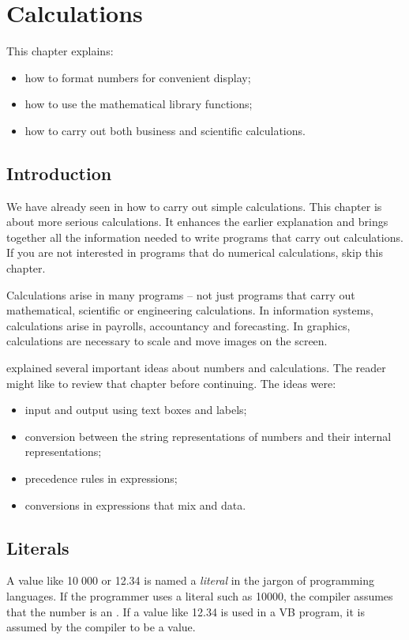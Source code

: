 \chapter{Calculations}
	\label{ch:calculations}

	This chapter explains:
	\begin{itemize}
    \item how to format numbers for convenient display;
    \item how to use the mathematical library functions;
    \item how to carry out both business and scientific calculations.
	\end{itemize}


  \section{Introduction}
	We have already seen in  how to carry out simple calculations. This chapter is about more serious calculations. It enhances the earlier explanation and brings together all the information needed to write programs that carry out calculations. If you are not interested in programs that do numerical calculations, skip this chapter.
		
		Calculations arise in many programs – not just programs that carry out mathematical, scientific or engineering calculations. In information systems, calculations arise in payrolls, accountancy and forecasting. In graphics, calculations are necessary to scale and move images on the screen.

		 explained several important ideas about numbers and calculations. The reader might like to review that chapter before continuing. The ideas were:
		\begin{itemize}
      \item input and output using text boxes and labels;
      \item conversion between the string representations of numbers and their internal representations;
      \item precedence rules in expressions;
      \item conversions in expressions that mix  and  data.
		\end{itemize}


	\section{Literals}
		A value like 10 000 or 12.34 is named a \emph{literal} in the jargon of programming languages. If the programmer uses a literal such as 10000, the compiler assumes that the number is an . If a value like 12.34 is used in a VB program, it is assumed by the compiler to be a  value.
		
